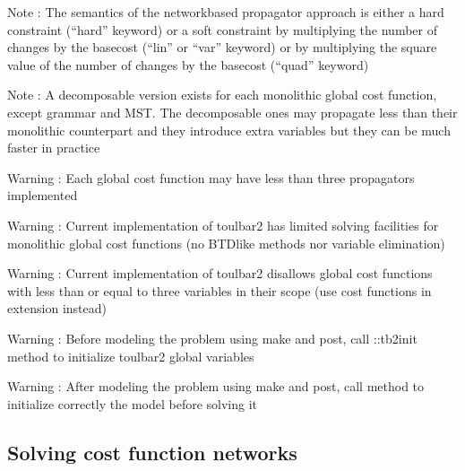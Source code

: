 \documentclass[letterpaper,10pt,openany,oneside,english]{sphinxmanual}
\begin{document}
\begin{fulllineitems}
\sphinxAtStartPar
Note : The semantics of the network\sphinxhyphen{}based propagator approach is either a hard constraint (“hard” keyword) or a soft constraint by multiplying the number of changes by the basecost (“lin” or “var” keyword) or by multiplying the square value of the number of changes by the basecost (“quad” keyword)

\sphinxAtStartPar
Note : A decomposable version exists for each monolithic global cost function, except grammar and MST. The decomposable ones may propagate less than their monolithic counterpart and they introduce extra variables but they can be much faster in practice

\sphinxAtStartPar
Warning : Each global cost function may have less than three propagators implemented

\sphinxAtStartPar
Warning : Current implementation of toulbar2 has limited solving facilities for monolithic global cost functions (no BTD\sphinxhyphen{}like methods nor variable elimination)

\sphinxAtStartPar
Warning : Current implementation of toulbar2 disallows global cost functions with less than or equal to three variables in their scope (use cost functions in extension instead)

\sphinxAtStartPar
Warning : Before modeling the problem using make and post, call ::tb2init method to initialize toulbar2 global variables

\sphinxAtStartPar
Warning : After modeling the problem using make and post, call {\hyperref[\detokenize{ref/ref_cpp:classWeightedCSP_1a31a9384d3dabf5388fe610710f2f19e0}]{}} method to initialize correctly the model before solving it 

\end{fulllineitems}



\subsection{Solving cost function networks}
\label{\detokenize{ref/ref_modules:solving-cost-function-networks}}
\end{document}
